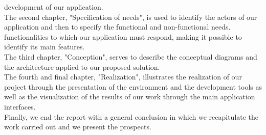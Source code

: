 development of our application.\\
The second chapter, "Specification of needs", is used to identify the actors of our application and then to specify the functional and non-functional needs.
functionalities to which our application must respond, making it possible to identify
its main features.\\
The third chapter, "Conception", serves to describe the conceptual diagrams and the architecture applied to our proposed solution.\\
The fourth and final chapter, "Realization", illustrates the realization
of our project through the presentation of the environment and the development tools as well as the visualization of the results of our work through
the main application interfaces.\\
Finally, we end the report with a general conclusion in which
we recapitulate the work carried out and we present the prospects.


